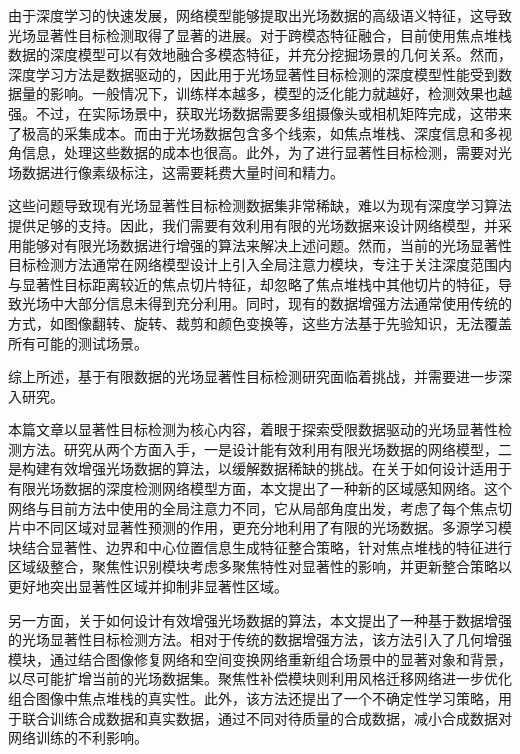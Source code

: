 
由于深度学习的快速发展，网络模型能够提取出光场数据的高级语义特征，这导致光场显著性目标检测取得了显著的进展。对于跨模态特征融合，目前使用焦点堆栈数据的深度模型可以有效地融合多模态特征，并充分挖掘场景的几何关系。然而，深度学习方法是数据驱动的，因此用于光场显著性目标检测的深度模型性能受到数据量的影响。一般情况下，训练样本越多，模型的泛化能力就越好，检测效果也越强。不过，在实际场景中，获取光场数据需要多组摄像头或相机矩阵完成，这带来了极高的采集成本。而由于光场数据包含多个线索，如焦点堆栈、深度信息和多视角信息，处理这些数据的成本也很高。此外，为了进行显著性目标检测，需要对光场数据进行像素级标注，这需要耗费大量时间和精力。

这些问题导致现有光场显著性目标检测数据集非常稀缺，难以为现有深度学习算法提供足够的支持。因此，我们需要有效利用有限的光场数据来设计网络模型，并采用能够对有限光场数据进行增强的算法来解决上述问题。然而，当前的光场显著性目标检测方法通常在网络模型设计上引入全局注意力模块，专注于关注深度范围内与显著性目标距离较近的焦点切片特征，却忽略了焦点堆栈中其他切片的特征，导致光场中大部分信息未得到充分利用。同时，现有的数据增强方法通常使用传统的方式，如图像翻转、旋转、裁剪和颜色变换等，这些方法基于先验知识，无法覆盖所有可能的测试场景。

综上所述，基于有限数据的光场显著性目标检测研究面临着挑战，并需要进一步深入研究。






本篇文章以显著性目标检测为核心内容，着眼于探索受限数据驱动的光场显著性检测方法。研究从两个方面入手，一是设计能有效利用有限光场数据的网络模型，二是构建有效增强光场数据的算法，以缓解数据稀缺的挑战。在关于如何设计适用于有限光场数据的深度检测网络模型方面，本文提出了一种新的区域感知网络。这个网络与目前方法中使用的全局注意力不同，它从局部角度出发，考虑了每个焦点切片中不同区域对显著性预测的作用，更充分地利用了有限的光场数据。多源学习模块结合显著性、边界和中心位置信息生成特征整合策略，针对焦点堆栈的特征进行区域级整合，聚焦性识别模块考虑多聚焦特性对显著性的影响，并更新整合策略以更好地突出显著性区域并抑制非显著性区域。

另一方面，关于如何设计有效增强光场数据的算法，本文提出了一种基于数据增强的光场显著性目标检测方法。相对于传统的数据增强方法，该方法引入了几何增强模块，通过结合图像修复网络和空间变换网络重新组合场景中的显著对象和背景，以尽可能扩增当前的光场数据集。聚焦性补偿模块则利用风格迁移网络进一步优化组合图像中焦点堆栈的真实性。此外，该方法还提出了一个不确定性学习策略，用于联合训练合成数据和真实数据，通过不同对待质量的合成数据，减小合成数据对网络训练的不利影响。




